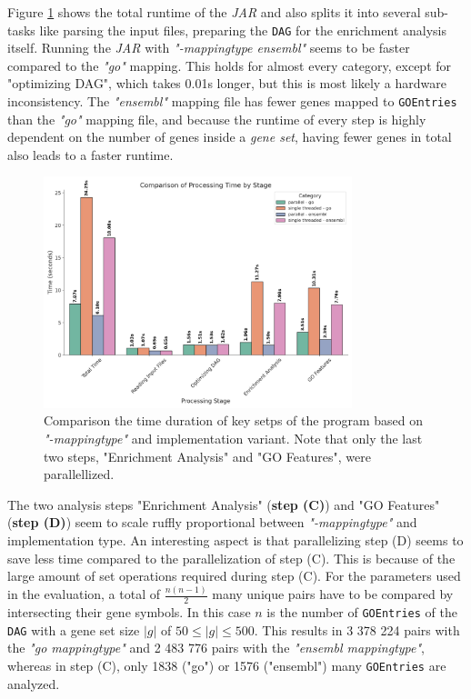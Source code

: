\documentclass[12pt]{article}
\begin{document}
Figure \ref{fig:-plots-times-png} shows the total runtime of the \textit{JAR} and
also splits it into several sub-tasks like parsing the input files, preparing the
\texttt{DAG} for the enrichment analysis itself. Running
the \textit{JAR} with \textit{"-mappingtype ensembl"} seems to be faster compared
to the \textit{"go"} mapping. This holds for almost every category, except for "optimizing DAG",
which takes 0.01s longer, but this is most likely a hardware inconsistency.
The \textit{"ensembl"} mapping file has fewer genes mapped to \texttt{GOEntries} than the 
\textit{"go"} mapping file, and because the runtime of every step is highly dependent
on the number of genes inside a \textit{gene set}, having fewer genes in total also leads to a faster
runtime.
\begin{figure}[htpb]
    \centering
    \includegraphics[width=0.8\textwidth]{./plots/times.png}
    \caption{Comparison the time duration of key setps of the program based on\\ \textit{"-mappingtype"} and implementation variant.
    Note that only the last two steps, "Enrichment Analysis" and "GO Features", were parallellized.}
    \label{fig:-plots-times-png}
\end{figure}

The two analysis steps "Enrichment Analysis" (\textbf{step (C)}) and "GO Features" (\textbf{step (D)})
seem to scale ruffly proportional between \textit{"-mappingtype"} and implementation type.
An interesting aspect is that parallelizing step (D) seems to save less time compared 
to the parallelization of step (C). This is because of the large amount of set operations 
required during step (C). For the parameters used in the evaluation, 
a total of $\frac{n(n - 1)}{2}$ many unique pairs have to be compared by intersecting their
gene symbols. 
In this case $n$ is the number of \texttt{GOEntries} of the \texttt{DAG} with a gene set 
size $|g|$ of $50 \le |g| \le 500$. This results in 3 378 224 pairs with the \textit{"go
mappingtype"} and 2 483 776 pairs with the \textit{"ensembl mappingtype"},
whereas in step (C), only 1838 ("go") or 1576 ("ensembl") many \texttt{GOEntries} 
are analyzed.
\end{document}
